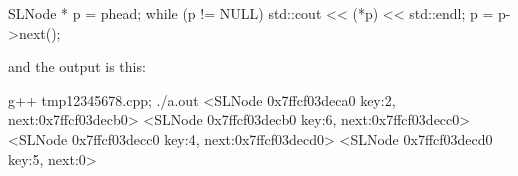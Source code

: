 \begin{console}[frame=single, , commandchars=~@$]
SLNode * p = phead;
while (p != NULL)
{
    std::cout << (*p) << std::endl;
    p = p->next();
}
\end{console}

and the output is this:
\begin{console} g++ tmp12345678.cpp; ./a.out
<SLNode 0x7ffcf03deca0 key:2, next:0x7ffcf03decb0>
<SLNode 0x7ffcf03decb0 key:6, next:0x7ffcf03decc0>
<SLNode 0x7ffcf03decc0 key:4, next:0x7ffcf03decd0>
<SLNode 0x7ffcf03decd0 key:5, next:0>
\end{console}

